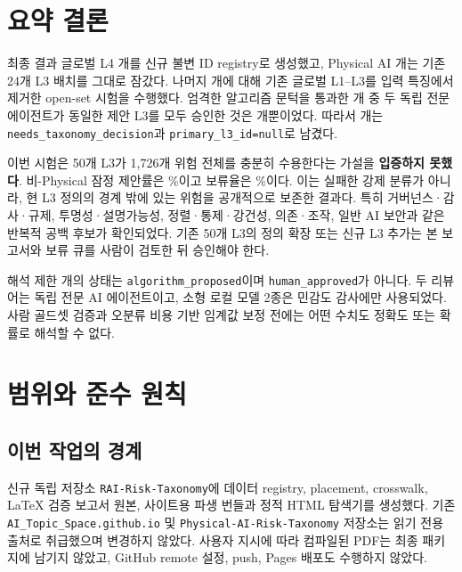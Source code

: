\documentclass[11pt,a4paper]{article}
\newcommand{\code}[1]{\texttt{#1}}
\begin{document}
\section*{요약 결론}

\begin{decisionbox}{최종 결과}
글로벌 L4 \TotalLFour{}개를 신규 불변 ID registry로 생성했고, Physical AI \PhysicalLocked{}개는 기존 24개 L3 배치를 그대로 잠갔다. 나머지 \NonPhysicalTotal{}개에 대해 기존 글로벌 L1--L3를 입력 특징에서 제거한 open-set 시험을 수행했다. 엄격한 알고리즘 문턱을 통과한 \InitialProposals{}개 중 두 독립 전문 에이전트가 동일한 제안 L3를 모두 승인한 것은 \FinalProposals{}개뿐이었다. 따라서 \NeedsDecision{}개는 \code{needs\_taxonomy\_decision}과 \code{primary\_l3\_id=null}로 남겼다.
\end{decisionbox}

이번 시험은 50개 L3가 1,726개 위험 전체를 충분히 수용한다는 가설을 \textbf{입증하지 못했다}. 비-Physical 잠정 제안률은 \ProposalRate\%이고 보류율은 \NeedsRate\%이다. 이는 실패한 강제 분류가 아니라, 현 L3 정의의 경계 밖에 있는 위험을 공개적으로 보존한 결과다. 특히 거버넌스·감사·규제, 투명성·설명가능성, 정렬·통제·강건성, 의존·조작, 일반 AI 보안과 같은 반복적 공백 후보가 확인되었다. 기존 50개 L3의 정의 확장 또는 신규 L3 추가는 본 보고서와 보류 큐를 사람이 검토한 뒤 승인해야 한다.

\begin{warningbox}{해석 제한}
\FinalProposals{}개의 상태는 \code{algorithm\_proposed}이며 \code{human\_approved}가 아니다. 두 리뷰어는 독립 전문 AI 에이전트이고, 소형 로컬 모델 2종은 민감도 감사에만 사용되었다. 사람 골드셋 검증과 오분류 비용 기반 임계값 보정 전에는 어떤 수치도 정확도 또는 확률로 해석할 수 없다.
\end{warningbox}

\tableofcontents
\newpage

\section{범위와 준수 원칙}

\subsection{이번 작업의 경계}

신규 독립 저장소 \code{RAI-Risk-Taxonomy}에 데이터 registry, placement, crosswalk, LaTeX 검증 보고서 원본, 사이트용 파생 번들과 정적 HTML 탐색기를 생성했다. 기존 \code{AI\_Topic\_Space.github.io} 및 \code{Physical-AI-Risk-Taxonomy} 저장소는 읽기 전용 출처로 취급했으며 변경하지 않았다. 사용자 지시에 따라 컴파일된 PDF는 최종 패키지에 남기지 않았고, GitHub remote 설정, push, Pages 배포도 수행하지 않았다.
\end{document}
